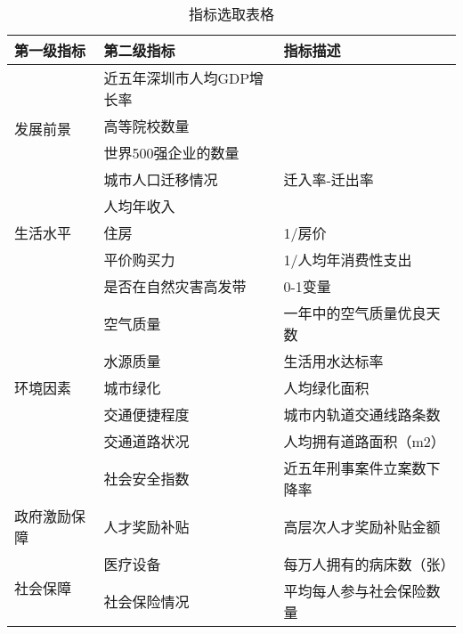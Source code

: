 \documentclass[withoutpreface,bwprint]{cumcmthesis} %
\begin{document}
\begin{table}[htbp]
  \centering
  \caption{指标选取表格}
    \begin{tabular}{lp{12.665em}p{16.835em}}
    \toprule
    第一级指标 & \multicolumn{1}{l}{第二级指标} & \multicolumn{1}{l}{指标描述} \\
    \midrule
    \multirow{4}[8]{*}{发展前景} & \multicolumn{1}{l}{近五年深圳市人均GDP增长率} & \multicolumn{1}{r}{} \\
\cmidrule{2-3}      & \multicolumn{1}{l}{高等院校数量} & \multicolumn{1}{r}{} \\
\cmidrule{2-3}      & \multicolumn{1}{l}{世界500强企业的数量} & \multicolumn{1}{r}{} \\
\cmidrule{2-3}      & \multicolumn{1}{l}{城市人口迁移情况} & \multicolumn{1}{l}{迁入率-迁出率} \\
    \midrule
    \multirow{3}[6]{*}{生活水平} & \multicolumn{1}{l}{人均年收入} & \multicolumn{1}{r}{} \\
\cmidrule{2-3}      & \multicolumn{1}{l}{住房} & \multicolumn{1}{l}{1/房价} \\
\cmidrule{2-3}      & \multicolumn{1}{l}{平价购买力} & \multicolumn{1}{l}{1/人均年消费性支出} \\
    \midrule
    \multirow{7}[14]{*}{环境因素} & \multicolumn{1}{l}{是否在自然灾害高发带} & \multicolumn{1}{l}{0-1变量} \\
\cmidrule{2-3}      & \multicolumn{1}{l}{空气质量} & \multicolumn{1}{l}{一年中的空气质量优良天数} \\
\cmidrule{2-3}      & \multicolumn{1}{l}{水源质量} & \multicolumn{1}{l}{生活用水达标率} \\
\cmidrule{2-3}      & \multicolumn{1}{l}{城市绿化} & \multicolumn{1}{l}{人均绿化面积} \\
\cmidrule{2-3}      & \multicolumn{1}{l}{交通便捷程度} & \multicolumn{1}{l}{城市内轨道交通线路条数} \\
\cmidrule{2-3}      & \multicolumn{1}{l}{交通道路状况} & \multicolumn{1}{l}{人均拥有道路面积（m2）} \\
\cmidrule{2-3}      & \multicolumn{1}{l}{社会安全指数} & \multicolumn{1}{l}{近五年刑事案件立案数下降率} \\
    \midrule
    政府激励保障 & 人才奖励补贴 & \multicolumn{1}{l}{高层次人才奖励补贴金额} \\
    \midrule
    \multicolumn{1}{l}{\multirow{2}[4]{*}{社会保障}} & 医疗设备 & 每万人拥有的病床数（张） \\
\cmidrule{2-3}      & 社会保险情况 & 平均每人参与社会保险数量 \\
    \bottomrule
    \end{tabular}%
  \label{tab:zbxq}%
\end{table}%
\end{document}

